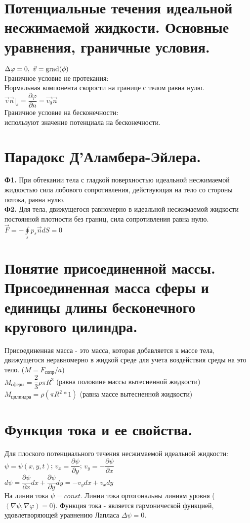 \begin{multicols*}{2}
		\section{Потенциальные течения идеальной несжимаемой жидкости. Основные уравнения, граничные условия.}
		$\Delta \varphi=0,~\vec{v}=\operatorname{grad}(\phi)$ \\
		Граничное условие не протекания: \\
		Нормальная компонента скорости на границе с телом равна нулю.\\
		$\vec{v}\vec{n}|_s=\dfrac{\partial\varphi}{\partial n}=\vec{v_0}\vec{n}$ \\
		Граничное условие на бесконечности: \\
		используют значение потенциала на бесконечности.\\
		
		\section{Парадокс Д’Аламбера-Эйлера.}
		\textbf{Ф1.} При обтекании тела с гладкой поверхностью идеальной
		несжимаемой жидкостью сила лобового сопротивления, действующая на тело
		со стороны потока, равна нулю. \\
		\textbf{Ф2.} Для тела, движущегося равномерно в идеальной несжимаемой жидкости постоянной плотности без границ, сила сопротивления равна
		нулю.\\
		$\vec{F}=-\oint\limits_sp_s\vec{n}dS=0$
		
		\section{Понятие присоединенной массы. Присоединенная масса сферы и единицы длины бесконечного кругового цилиндра.}
		Присоединенная масса - это масса, которая добавляется к массе тела, движущегося неравномерно в жидкой среде для учета воздействия среды на это тело. 
		($M=F_\text{сопр}/a$) \\
		$M_\text{сферы}=\dfrac{2}{3}\rho\pi R^3$ (равна половине массы вытесненной жидкости)\\
		$M_\text{цилиндра}=\rho(\pi R^2*1)$ (равна массе вытесненной жидкости)
		
		\section{Функция тока и ее свойства.}
		Для плоского потенциального течения несжимаемой идеальной жидкости: \\
		$\psi = \psi (x, y, t)$; $v_{x}=\dfrac{\partial\psi}{\partial y}$; $v_{y}=-\dfrac{\partial\psi}{\partial x}$ \\
		$d\psi = \dfrac{\partial\psi}{\partial x}dx + \dfrac{\partial\psi}{\partial y}dy = -v_{y}dx + v_{x}dy$\\
		На линии тока $\psi = const$. Линии тока ортогональны линиям уровня ($(\nabla\psi, \nabla\varphi)=0$). Функция тока - является гармонической функцией, удовлетворяющей уравнению Лапласа $\Delta \psi = 0$. 
		

\end{multicols*}

